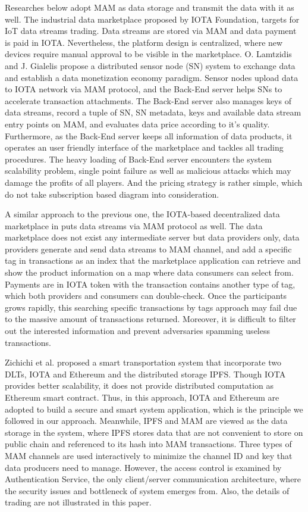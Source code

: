 Researches below adopt MAM as data storage and transmit the data with it as well. The industrial data marketplace\cite{IOTAIdustryMarketplace} proposed by IOTA Foundation, targets for IoT data streams trading. Data streams are stored via MAM and data payment is paid in IOTA. Nevertheless, the platform design is centralized, where new devices require manual approval to be visible in the marketplace. O. Lamtzidis and J. Gialelis \cite{IOTASensorNode} propose a distributed sensor node (SN) system to exchange data and establish a data monetization economy paradigm. Sensor nodes upload data to IOTA network via MAM protocol, and the Back-End server helps SNs to accelerate transaction attachments. The Back-End server also manages keys of data streams, record a tuple of SN, SN metadata, keys and available data stream entry points on MAM, and evaluates data price according to it's quality. Furthermore, as the Back-End server keeps all information of data products, it operates an user friendly interface of the marketplace and tackles all trading procedures. The heavy loading of Back-End server encounters the system scalability problem, single point failure as well as malicious attacks which may damage the profits of all players. And the pricing strategy is rather simple, which do not take subscription based diagram into consideration.

A similar approach to the previous one, the IOTA-based decentralized data marketplace in \cite{DDMSmartCities} puts data streams via MAM protocol as well. The data marketplace does not exist any intermediate server but data providers only, data providers generate and send data streams to MAM channel, and add a specific tag in transactions as an index that the marketplace application can retrieve and show the product information on a map where data consumers can select from. Payments are in IOTA token with the transaction contains another type of tag, which both providers and consumers can double-check. Once the participants grows rapidly, this searching specific transactions by tags approach may fail due to the massive amount of transactions returned. Moreover, it is difficult to filter out the interested information and prevent adversaries spamming useless transactions.

Zichichi et al.\cite{SocialGood} proposed a smart transportation system that incorporate two DLTs, IOTA and Ethereum and the distributed storage IPFS. Though IOTA provides better scalability, it does not provide distributed computation as Ethereum smart contract. Thus, in this approach, IOTA and Ethereum are adopted to build a secure and smart system application, which is the principle we followed in our approach. Meanwhile, IPFS and MAM are viewed as the data storage in the system, where IPFS stores data that are not convenient to store on public chain and referenced to its hash into MAM transactions. Three types of MAM channels are used interactively to minimize the channel ID and key that data producers need to manage. However, the access control is examined by Authentication Service, the only client/server communication architecture, where the security issues and bottleneck of system emerges from. Also, the details of trading are not illustrated in this paper.

